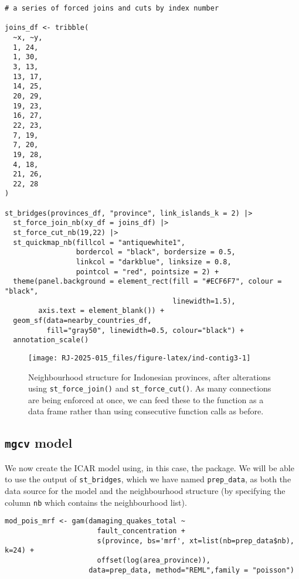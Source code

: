 \begin{verbatim}
# a series of forced joins and cuts by index number

joins_df <- tribble(
  ~x, ~y,
  1, 24,
  1, 30,
  3, 13,
  13, 17,
  14, 25,
  20, 29,
  19, 23,
  16, 27,
  22, 23,
  7, 19,
  7, 20,
  19, 28,
  4, 18,
  21, 26,
  22, 28
)

st_bridges(provinces_df, "province", link_islands_k = 2) |>
  st_force_join_nb(xy_df = joins_df) |>
  st_force_cut_nb(19,22) |>
  st_quickmap_nb(fillcol = "antiquewhite1",
                 bordercol = "black", bordersize = 0.5,
                 linkcol = "darkblue", linksize = 0.8,
                 pointcol = "red", pointsize = 2) +
  theme(panel.background = element_rect(fill = "#ECF6F7", colour = "black",
                                        linewidth=1.5),
        axis.text = element_blank()) +
  geom_sf(data=nearby_countries_df,
          fill="gray50", linewidth=0.5, colour="black") +
  annotation_scale()
\end{verbatim}

\begin{figure}

{\centering \texttt{[image: RJ-2025-015\_files/figure-latex/ind-contig3-1]} 

}

\caption{Neighbourhood structure for Indonesian provinces, after alterations using \texttt{st\_force\_join()} and \texttt{st\_force\_cut()}. As many connections are being enforced at once, we can feed these to the function as a data frame rather than using consecutive function calls as before.}\label{fig:ind-contig3}
\end{figure}

\subsection{\texorpdfstring{\texttt{mgcv} model}{mgcv model}}\label{mgcv-model}

We now create the ICAR model using, in this case, the  package. We will be able to use the output of \texttt{st\_bridges}, which we have named \texttt{prep\_data}, as both the data source for the model and the neighbourhood structure (by specifying the column \texttt{nb} which contains the neighbourhood list).

\begin{verbatim}
mod_pois_mrf <- gam(damaging_quakes_total ~
                      fault_concentration +
                      s(province, bs='mrf', xt=list(nb=prep_data$nb), k=24) +
                      offset(log(area_province)),
                    data=prep_data, method="REML",family = "poisson")
\end{verbatim}

